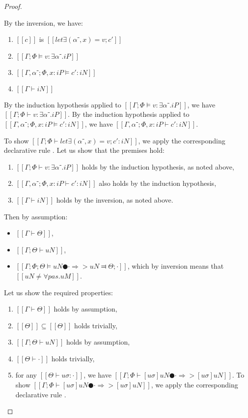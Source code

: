 \begin{proof}
\begin{caseof}
        \item {}
        By the inversion, we have:
        \begin{enumerate}
            \item $[[c]]$ is $[[let∃ (α⁻, x) = v; c']]$
            \item $[[Γ; Φ ⊨ v : ∃α⁻.iP]]$
            \item $[[Γ, α⁻ ; Φ, x:iP ⊨ c' : iN]]$
            \item $[[Γ ⊢ iN]]$
        \end{enumerate}

        By the induction hypothesis applied to 
        $[[Γ; Φ ⊨ v : ∃α⁻.iP]]$, we have $[[Γ; Φ ⊢ v : ∃α⁻.iP]]$.
        By the induction hypothesis applied to
        $[[Γ, α⁻ ; Φ, x:iP ⊨ c' : iN]]$, we have $[[Γ, α⁻ ; Φ, x:iP ⊢ c' : iN]]$.

        To show $[[Γ; Φ ⊢ let∃ (α⁻, x) = v; c' : iN]]$, we apply the corresponding
        declarative rule . Let us show that the premises hold:
        \begin{enumerate}
            \item $[[Γ ; Φ ⊢ v : ∃α⁻.iP]]$ holds by the induction hypothesis, as noted above,
            \item $[[Γ, α⁻ ; Φ, x:iP ⊢ c' : iN]]$ also holds by the induction hypothesis,
            \item $[[Γ ⊢ iN]]$ holds by the inversion, as noted above.
        \end{enumerate}

        \item {}
        Then by assumption:
        \begin{itemize}
            \item $[[Γ ⊢ Θ]]$,
            \item $[[Γ; Θ ⊢ uN]]$,
            \item $[[Γ; Φ; Θ ⊨ uN ● · ⇒> uN ⫤ Θ; ·]]$, which by inversion means that $[[uN ≠ ∀pas.uM]]$.
        \end{itemize}

        Let us show the required properties: 
        \begin{enumerate}
            \item $[[Γ ⊢ Θ]]$ holds by assumption,
            \item $[[Θ]] \subseteq [[Θ]]$ holds trivially,
            \item $[[Γ; Θ ⊢ uN]]$ holds by assumption,
            \item $[[Θ ⊢ ·]]$ holds trivially,
            \item for any $[[Θ ⊢ uσ : ·]]$, we have $[[ Γ ; Φ ⊢ [uσ]uN ● · ⇒> [uσ]uN ]]$.
                To show $[[ Γ ; Φ ⊢ [uσ]uN ● · ⇒> [uσ]uN ]]$, we apply the corresponding 
                declarative rule . 
        \end{enumerate}


\end{caseof}
\end{proof}
